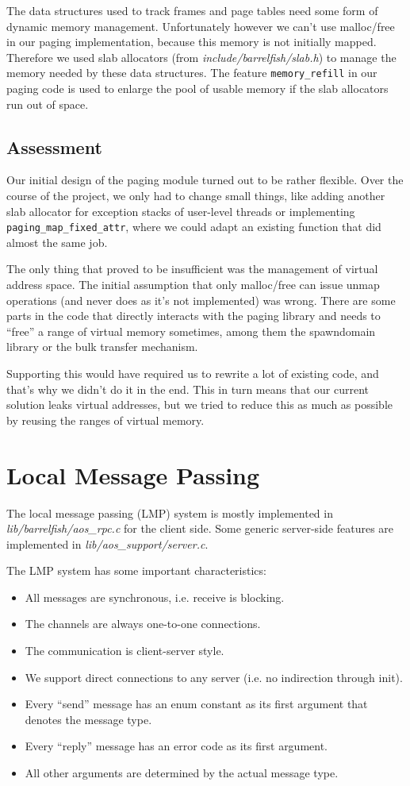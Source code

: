 \documentclass[a4paper,10pt]{article}
\newcommand{\filepath}[1]{\emph{ #1}}
\begin{document}
The data structures used to track frames and page tables need some form of dynamic memory management.
Unfortunately however we can't use malloc/free in our paging implementation, because this memory is not initially mapped.
Therefore we used slab allocators (from \filepath{include/barrelfish/slab.h}) to manage the memory needed by these data structures.
The feature \lstinline!memory_refill! in our paging code is used to enlarge the pool of usable memory if the slab allocators run out of space.

\subsection{Assessment}

Our initial design of the paging module turned out to be rather flexible.
Over the course of the project, we only had to change small things, like adding another slab allocator for exception stacks of user-level threads 
or implementing \lstinline!paging_map_fixed_attr!, where we could adapt an existing function that did almost the same job.

The only thing that proved to be insufficient was the management of virtual address space.
The initial assumption that only malloc/free can issue unmap operations (and never does as it's not implemented) was wrong.
There are some parts in the code that directly interacts with the paging library and needs to ``free'' a range of virtual memory sometimes, among them the spawndomain library or the bulk transfer mechanism.

Supporting this would have required us to rewrite a lot of existing code, and that's why we didn't do it in the end.
This in turn means that our current solution leaks virtual addresses, but we tried to reduce this as much as possible by reusing the ranges of virtual memory.

\section{Local Message Passing}

The local message passing (LMP) system is mostly implemented in \filepath{lib/barrelfish/aos\_rpc.c} for the client side.
Some generic server-side features are implemented in \filepath{lib/aos\_support/server.c}.

The LMP system has some important characteristics:
\begin{itemize}
 \item All messages are synchronous, i.e. receive is blocking.
 \item The channels are always one-to-one connections.
 \item The communication is client-server style.
 \item We support direct connections to any server (i.e. no indirection through init).
 \item Every ``send'' message has an enum constant as its first argument that denotes the message type.
 \item Every ``reply'' message has an error code as its first argument.
 \item All other arguments are determined by the actual message type.
\end{itemize}
\end{document}

